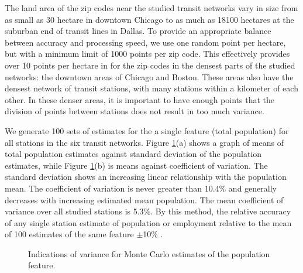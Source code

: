 \documentclass[11pt]{article}
\begin{document}
The land area of the zip codes near the studied transit networks vary in size from as small as 30 hectare in downtown Chicago to as much as 18100 hectares at the suburban end of transit lines in Dallas. To provide an appropriate balance between accuracy and processing speed, we use one random point per hectare, but with a minimum limit of 1000 points per zip code. This effectively provides over 10 points per hectare in for the zip codes in the densest parts of the studied networks: the downtown areas of Chicago and Boston. These areas also have the densest network of transit stations, with many stations within a kilometer of each other. In these denser areas, it is important to have enough points that the division of points between stations does not result in too much variance. 

We generate 100 sets of estimates for the a single feature (total population) for all stations in the six transit networks. Figure \ref{fig:mcvar}(a) shows a graph of means of total population estimates against standard deviation of the population estimates, while Figure \ref{fig:mcvar}(b) is means against coefficient of variation. The standard deviation shows an increasing linear relationship with the population mean. The coefficient of variation is never greater than 10.4\% and generally decreases with increasing estimated mean population. The mean coefficient of variance over all studied stations is 5.3\%. By this method, the relative accuracy of any single station estimate of population or employment relative to the mean of 100 estimates of the same feature $\pm$10\% .

\begin{figure}[H]
\centering
{}
\caption{Indications of variance for Monte Carlo estimates of the population feature.}\label{fig:mcvar}
\end{figure}
\end{document}
